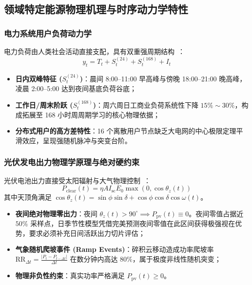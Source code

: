 \subsection{领域特定能源物理机理与时序动力学特性}
\label{subsec:physics_zh}

\subsubsection{电力系统用户负荷动力学}
电力负荷由人类社会活动直接支配，具有双重强周期结构~\cite{hong2016probabilistic}：
\begin{equation}
    y_t = T_t + S_t^{(24)} + S_t^{(168)} + I_t
\end{equation}
\begin{itemize}
    \item \textbf{日内双峰特征 ($S_t^{(24)}$)}：晨间 8:00--11:00 早高峰与傍晚 18:00--21:00 晚高峰，凌晨 2:00--5:00 达到夜间基底负荷谷底；
    \item \textbf{工作日/周末阶跃 ($S_t^{(168)}$)}：周六周日工商业负荷系统性下降 $15\% \sim 30\%$，构成拓展至 168 小时周周期学习的核心物理依据；
    \item \textbf{分布式用户的高方差特性}：16 个离散用户节点缺乏大电网的中心极限定理平滑效应，呈现强随机脉冲与突变台阶。
\end{itemize}

\subsubsection{光伏发电出力物理学原理与绝对硬约束}
光伏电池出力直接受太阳辐射与大气物理控制~\cite{sobri2018solar, inman2013solar, zhang2014review}：
\begin{equation}
    P_{\text{clear}}(t) = \eta A I_{\text{sc}} E_0 \max(0, \cos \theta_z(t))
\end{equation}
其中天顶角满足 $\cos \theta_z(t) = \sin \phi \sin \delta + \cos \phi \cos \delta \cos \omega(t)$。
\begin{itemize}
    \item \textbf{夜间绝对物理零出力}：夜间 $\theta_z(t) > 90^\circ \implies P_{\text{pv}}(t) \equiv 0$。夜间零值占据近 $50\%$ 采样点，日季节性模型凭借完美预测夜间零值在此区间获得极强视在优势，要求必须补充日间活跃出力切片评估；
    \item \textbf{气象随机爬坡事件 (Ramp Events)}：碎积云移动造成功率爬坡率 $\text{RR}_{\Delta t} = \frac{|P_t - P_{t-\Delta t}|}{\Delta t}$ 在数分钟内高达 $80\%$，属于极度非线性随机突变；
    \item \textbf{物理非负性约束}：真实功率严格满足 $P_{\text{pv}}(t) \ge 0$。
\end{itemize}

